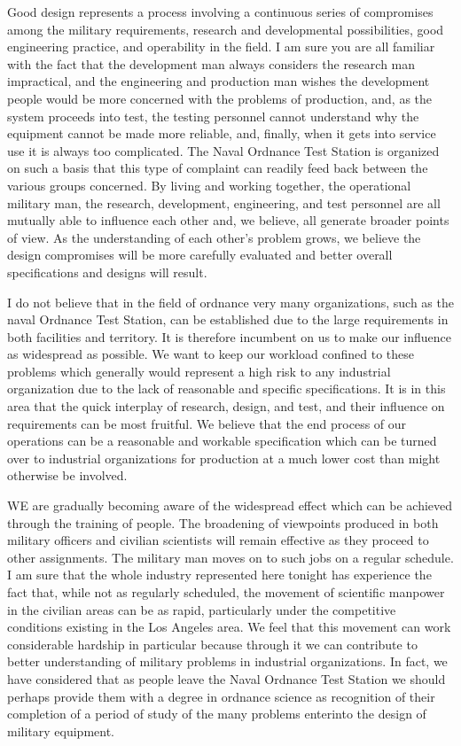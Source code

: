 \documentclass{memoir}
\begin{document}
Good design represents a process involving a continuous series of compromises among the military requirements, research and developmental possibilities, good engineering practice, and operability in the field. I am sure you are all familiar with the fact that the development man always considers the research man impractical, and the engineering and production man wishes the development people would be more concerned with the problems of production, and, as the system proceeds into test, the testing personnel cannot understand why the equipment cannot be made more reliable, and, finally, when it gets into service use it is always too complicated. The Naval Ordnance Test Station is organized on such a basis that this type of complaint can readily feed back between the various groups concerned. By living and working together, the operational military man, the research, development, engineering, and test personnel are all mutually able to influence each other and, we believe, all generate broader points of view. As the understanding of each other's problem grows, we believe the design compromises will be more carefully evaluated and better overall specifications and designs will result.

I do not believe that in the field of ordnance very many organizations, such as the naval Ordnance Test Station, can be established due to the large requirements in both facilities and territory. It is therefore incumbent on us to make our influence as widespread as possible. We want to keep our workload confined to these problems which generally would represent a high risk to any industrial organization due to the lack of reasonable and specific specifications. It is in this area that the quick interplay of research, design, and test, and their influence on requirements can be most fruitful. We believe that the end process of our operations can be a reasonable and workable specification which can be turned over to industrial organizations for production at a much lower cost than might otherwise be involved.

WE are gradually becoming aware of the widespread effect which can be achieved through the training of people. The broadening of viewpoints produced in both military officers and civilian scientists will remain effective as they proceed to other assignments. The military man moves on to such jobs on a regular schedule. I am sure that the whole industry represented here tonight has experience the fact that, while not as regularly scheduled, the movement of scientific manpower in the civilian areas can be as rapid, particularly under the competitive conditions existing in the Los Angeles area. We feel that this movement can work considerable hardship in particular because through it we can contribute to better understanding of military problems in industrial organizations. In fact, we have considered that as people leave the Naval Ordnance Test Station we should perhaps provide them with a degree in ordnance science as recognition of their completion of a period of study of the many problems enterinto the design of military equipment.
\end{document}
